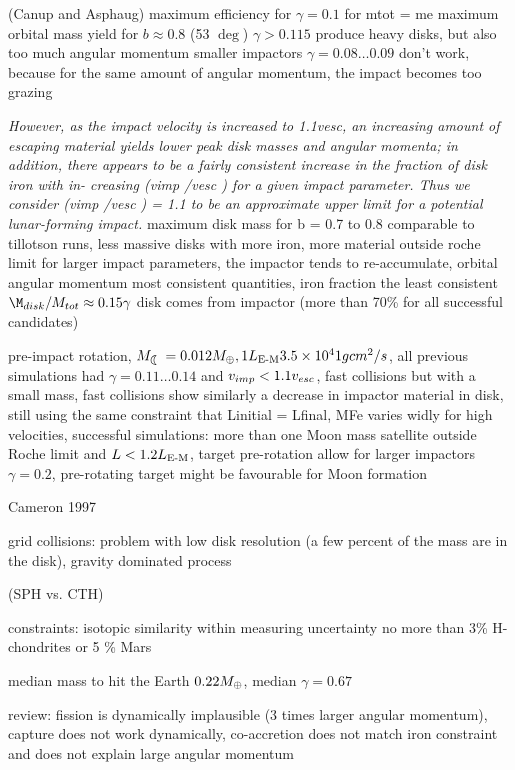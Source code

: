 \cite{Canup:2001p1861} (Canup and Asphaug)
maximum efficiency for $\gamma = 0.1$ for mtot = me
maximum orbital mass yield for $b \approx 0.8 $ (53 $\deg$)
$\gamma > 0.115$ produce heavy disks, but also too much angular momentum
smaller impactors $\gamma = 0.08 \dots 0.09$ don't work, because for the same amount of angular momentum, the impact becomes too grazing


\citep{Canup:2004p115}  \emph{However, as the impact velocity is increased to 1.1vesc, an increasing amount of escaping material yields lower peak disk masses and angular momenta; in addition, there appears to be a fairly consistent increase in the fraction of disk iron with in- creasing	(vimp /vesc ) for a given impact parameter. Thus we consider (vimp /vesc ) = 1.1 to be an approximate upper limit for a potential lunar-forming impact.}
maximum disk mass for b = 0.7 to 0.8
comparable to tillotson runs, less massive disks with more iron, more material outside roche limit
for larger impact parameters, the impactor tends to re-accumulate, 
orbital angular momentum most consistent quantities, iron fraction the least consistent
$\M_{disk} / \Mtot \approx 0.15 \gamma$ 
disk comes from impactor (more than 70\% for all successful candidates)

\citep{Canup:2008p3551}
pre-impact rotation, $\ML = 0.012 \ME, 1 \lem 3.5 \times 10^41 g cm^2 / s$, all previous simulations had $\gamma = 0.11 \dots 0.14$ and $v_{imp} < 1.1 v_{esc}$, fast collisions but with a small mass, fast collisions show similarly a decrease in impactor material in disk, still using the same constraint that Linitial = Lfinal, MFe varies widly for high velocities, successful simulations: more than one Moon mass satellite outside Roche limit and $L < 1.2 L_{\textrm{E-M}}$, target pre-rotation allow for larger impactors $\gamma = 0.2$, pre-rotating target might be favourable for Moon formation

\cite{1997Icar..126..126C} Cameron 1997

grid collisions:
\cite{Wada:2006p1013}
problem with low disk resolution (a few percent of the mass are in the disk), gravity dominated process

\citep{Canup:2010p3713} (SPH vs. CTH)

constraints:
\cite{Wiechert:2001p3543}
isotopic similarity within measuring uncertainty
no more than 3\% H-chondrites or 5 \% Mars

\cite{Chambers:2001p2105}
median mass to hit the Earth $0.22 M_{\oplus}$, median $\gamma = 0.67$

\cite{Stevenson:1987p3540}
review: fission is dynamically implausible (3 times larger angular momentum), capture does not work dynamically, co-accretion does not match iron constraint and does not explain large angular momentum

